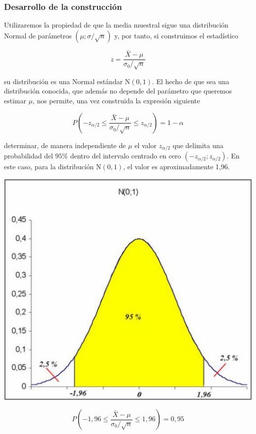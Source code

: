 \documentclass[
]{article}
\begin{document}
\subsubsection{Desarrollo de la construcción}\label{desarrollo-de-la-construcciuxf3n}

Utilizaremos la propiedad de que la media muestral sigue una distribución Normal de parámetros \((\mu ; \sigma/\sqrt{n})\) y, por tanto, si construimos el estadístico

\[
z=\frac{\bar{X}-\mu}{\sigma_{0} / \sqrt{n}}
\]

su distribución es una Normal estándar \(\mathrm{N}(0,1)\).
El hecho de que sea una distribución conocida, que además no depende del parámetro que queremos estimar \(\mu\), nos permite, una vez construida la expresión siguiente

\[
P\left(-z_{\alpha / 2} \leq \frac{\bar{X}-\mu}{\sigma_{0} / \sqrt{n}} \leq z_{\alpha / 2}\right)=1-\alpha
\]

determinar, de manera independiente de \(\mu\) el valor \(z_{\alpha / 2}\) que delimita una probabilidad del \(95 \%\) dentro del intervalo centrado en cero \(\left(-z_{\alpha / 2} ; z_{\alpha / 2}\right)\). En este caso, para la distribución \(\mathrm{N}(0,1)\), el valor es aproximadamente 1,96.

\begin{center}\includegraphics[width=0.9\linewidth]{images/dNormalQuantil975} \end{center}

\[
P\left(-1,96 \leq \frac{\bar{X}-\mu}{\sigma_{0} / \sqrt{n}} \leq 1,96\right)=0,95
\]
\end{document}

